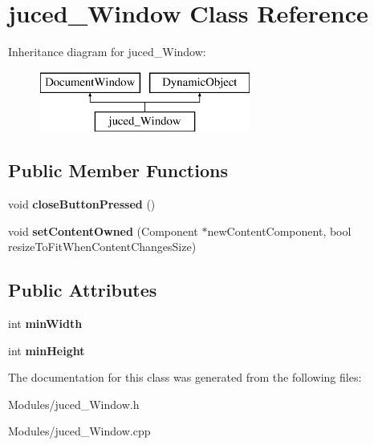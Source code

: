 \hypertarget{classjuced___window}{\section{juced\-\_\-\-Window Class Reference}
\label{classjuced___window}
}
Inheritance diagram for juced\-\_\-\-Window\-:\begin{figure}[H]
\begin{center}
\leavevmode
\includegraphics[height=2.000000cm]{classjuced___window}
\end{center}
\end{figure}
\subsection*{Public Member Functions}
\begin{DoxyCompactItemize}
\item 
\hypertarget{classjuced___window_a88ce694f6478b19974660f6a046475e2}{void {\bfseries close\-Button\-Pressed} ()}\label{classjuced___window_a88ce694f6478b19974660f6a046475e2}

\item 
\hypertarget{classjuced___window_a3651c851d5081ab66dbe888caea5411d}{void {\bfseries set\-Content\-Owned} (Component $\ast$new\-Content\-Component, bool resize\-To\-Fit\-When\-Content\-Changes\-Size)}\label{classjuced___window_a3651c851d5081ab66dbe888caea5411d}

\end{DoxyCompactItemize}
\subsection*{Public Attributes}
\begin{DoxyCompactItemize}
\item 
\hypertarget{classjuced___window_af0f4f5da40c9300990dea9fbb5080be2}{int {\bfseries min\-Width}}\label{classjuced___window_af0f4f5da40c9300990dea9fbb5080be2}

\item 
\hypertarget{classjuced___window_a05a4bab2e2400691e432ad2ad2d2a4f2}{int {\bfseries min\-Height}}\label{classjuced___window_a05a4bab2e2400691e432ad2ad2d2a4f2}

\end{DoxyCompactItemize}


The documentation for this class was generated from the following files\-:\begin{DoxyCompactItemize}
\item 
Modules/juced\-\_\-\-Window.\-h\item 
Modules/juced\-\_\-\-Window.\-cpp\end{DoxyCompactItemize}
